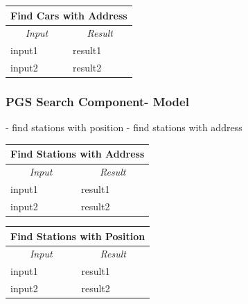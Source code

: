 \documentclass[english]{article}
\begin{document}
\begin{center}

	\begin{tabular}{ | p{6cm} | p{6cm} | }
		\hline 


		\hline

		\multicolumn{2}{|c|}{\textbf{Find Cars with Address}} \\
		\hline
		\multicolumn{1}{|c|}{\textit{Input}} & \multicolumn{1}{c|}{\textit{Result}} \\
		\hline
		input1 & result1 \\
		\hline
		input2 & result2 \\
		\hline
	\end{tabular}
\end{center}

\subsubsection{PGS Search Component- Model}
- find stations with position
- find stations with address

\begin{center}

	\begin{tabular}{ | p{6cm} | p{6cm} | }
		\hline 


		\hline

		\multicolumn{2}{|c|}{\textbf{Find Stations with Address}} \\
		\hline
		\multicolumn{1}{|c|}{\textit{Input}} & \multicolumn{1}{c|}{\textit{Result}} \\
		\hline
		input1 & result1 \\
		\hline
		input2 & result2 \\
		\hline
	\end{tabular}
\end{center}

\begin{center}

	\begin{tabular}{ | p{6cm} | p{6cm} | }
		\hline 


		\hline

		\multicolumn{2}{|c|}{\textbf{Find Stations with Position}} \\
		\hline
		\multicolumn{1}{|c|}{\textit{Input}} & \multicolumn{1}{c|}{\textit{Result}} \\
		\hline
		input1 & result1 \\
		\hline
		input2 & result2 \\
		\hline
	\end{tabular}
\end{center}
\end{document}
